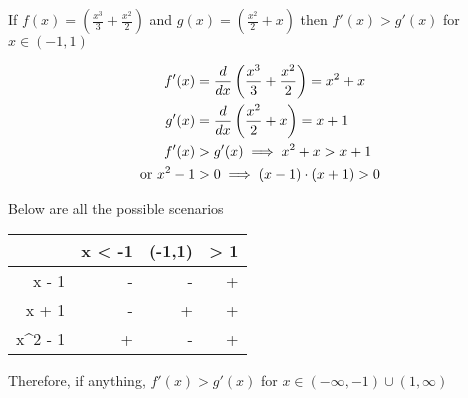 \documentclass[14pt,fleqn]{extarticle}
\newcommand\fx{ \left(\frac{x^3}{3} + \frac{x^2}{2} \right)}
\newcommand\gx{ \left(\frac{x^2}{2} + x \right)}
\begin{document}
 
\begin{snippet}
    \incorrect
    
    If $f(x) = \fx$ and $g(x) = \gx$ then $f'(x) > g'(x)$ for $x\in (-1,1)$ 
    
    \reason
    
    \begin{align}
	f'(x) &= \ddx \fx = x^2 + x \\
	g'(x) &= \ddx \gx = x + 1 \\ 
	f'(x) &> g'(x) \implies x^2 + x > x + 1 \\
	\text{or } x^2 - 1 &> 0 \implies (x-1)\cdot (x+1) > 0 
\end{align}

Below are all the possible scenarios 
\begin{center}
  \begin{tabular}{NNNN}
   \toprule
        & x < -1 & (-1,1) & > 1 \\
   \midrule 
   x - 1 & - & - & + \\ 
    \midrule 
    x + 1 & - & + & + \\ 
    \midrule
    x^2 - 1 & + & - & + \\
    \bottomrule
  \end{tabular}
\end{center}
Therefore, if anything, $f'(x) > g'(x)$ for $x\in (-\infty, -1)\cup (1,\infty)$ 
\end{snippet} 
\end{document}
